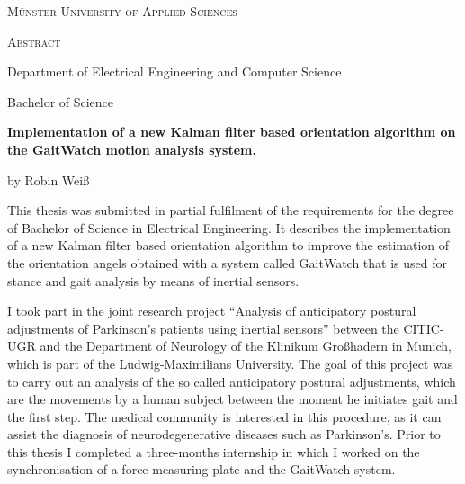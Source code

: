 \thispagestyle{plain}
  \null\vfil
  
\begin{center}
    \setlength{\parskip}{0pt}
    {\normalsize \textsc{Münster University of Applied Sciences} \par}
    \bigskip
    {\huge{\textsc{Abstract}} \par}
    \bigskip
    {\normalsize Department of Electrical Engineering and Computer Science \par}
    \bigskip
    {\normalsize Bachelor of Science \par}
    \bigskip
    {\normalsize\bf Implementation of a new Kalman filter based orientation algorithm on the GaitWatch motion analysis system.
 \par}
    \medskip
    {\normalsize by Robin Weiß \par}
    \bigskip
\end{center}

\noindent  
This thesis was submitted in partial fulfilment of the requirements for the degree of Bachelor of Science in Electrical Engineering. It describes the implementation of a new Kalman filter based orientation algorithm to improve the estimation of the orientation angels obtained with a system called GaitWatch that is used for stance and gait analysis by means of inertial sensors.

I took part in the joint research project “Analysis of anticipatory postural adjustments of Parkinson’s patients using inertial sensors” between the \gls{CITIC-UGR} and the Department of Neurology of the Klinikum Großhadern in Munich, which is part of the Ludwig-Maximilians University. The goal of this project was to carry out an analysis of the so called anticipatory postural adjustments, which are the movements by a human subject between the moment he initiates gait and the first step. The medical community is interested in this procedure, as it can assist the diagnosis of neurodegenerative diseases such as Parkinson's. Prior to this thesis I completed a three-months internship in which I worked on the synchronisation of a force measuring plate and the GaitWatch system.


